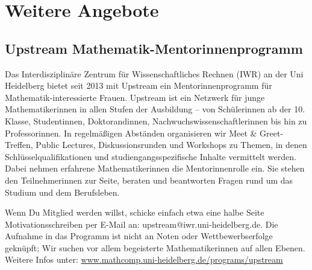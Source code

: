 \section{Weitere Angebote}

\subsection{Upstream Mathematik-Mentorinnenprogramm}
Das Interdisziplinäre Zentrum für Wissenschaftliches Rechnen (IWR) an der Uni Heidelberg bietet seit 2013 mit Upstream ein Mentorinnenprogramm für Mathematik-interessierte Frauen. Upstream ist ein Netzwerk für junge Mathematikerinnen in allen Stufen der Ausbildung -- von Schülerinnen ab der 10. Klasse, Studentinnen, Doktorandinnen, Nachwuchswissenschaftlerinnen bis hin zu Professorinnen. In regelmäßigen Abständen organisieren wir Meet \& Greet-Treffen, Public Lectures, Diskussionsrunden und Workshops zu Themen, in denen Schlüsselqualifikationen und studiengangsspezifische Inhalte vermittelt werden. Dabei nehmen erfahrene Mathematikerinnen die Mentorinnenrolle ein. Sie stehen den Teilnehmerinnen zur Seite, beraten und beantworten Fragen rund um das Studium und dem Berufsleben.

Wenn Du Mitglied werden willst, schicke einfach etwa eine halbe Seite Motivationsschreiben per E-Mail an: upstream@iwr.uni-heidelberg.de. Die Aufnahme in das Programm ist nicht an Noten oder Wettbewerbserfolge geknüpft; Wir suchen vor allem begeisterte Mathematikerinnen auf allen Ebenen. Weitere Infos unter: \url{www.mathcomp.uni-heidelberg.de/programs/upstream}

